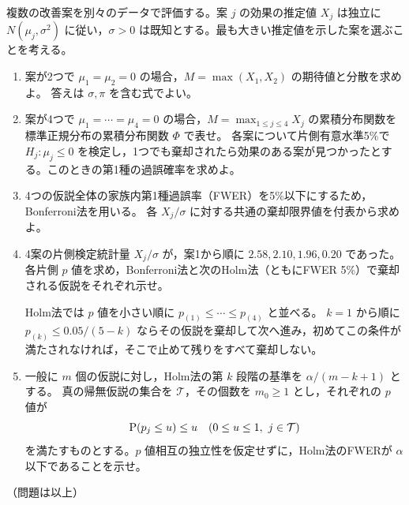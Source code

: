 \documentclass[a4paper,11pt]{ltjsarticle}
\begin{document}
複数の改善案を別々のデータで評価する。案 $j$ の効果の推定値 $X_j$ は独立に
$N(\mu_j,\sigma^2)$ に従い，$\sigma>0$ は既知とする。最も大きい推定値を示した案を選ぶことを考える。
\begin{enumerate}
\item 案が2つで $\mu_1=\mu_2=0$ の場合，$M=\max(X_1,X_2)$ の期待値と分散を求めよ。
答えは $\sigma,\pi$ を含む式でよい。
\item 案が4つで $\mu_1=\cdots=\mu_4=0$ の場合，$M=\max_{1\leq j\leq4}X_j$ の累積分布関数を標準正規分布の累積分布関数 $\Phi$ で表せ。
各案について片側有意水準5\%で $H_j:\mu_j\leq0$ を検定し，1つでも棄却されたら効果のある案が見つかったとする。このときの第1種の過誤確率を求めよ。
\item 4つの仮説全体の家族内第1種過誤率（FWER）を5\%以下にするため，Bonferroni法を用いる。
各 $X_j/\sigma$ に対する共通の棄却限界値を付表から求めよ。
\item 4案の片側検定統計量 $X_j/\sigma$ が，案1から順に $2.58,2.10,1.96,0.20$ であった。
各片側 $p$ 値を求め，Bonferroni法と次のHolm法（ともにFWER 5\%）で棄却される仮説をそれぞれ示せ。

Holm法では $p$ 値を小さい順に $p_{(1)}\leq\cdots\leq p_{(4)}$ と並べる。
$k=1$ から順に $p_{(k)}\leq0.05/(5-k)$ ならその仮説を棄却して次へ進み，初めてこの条件が満たされなければ，そこで止めて残りをすべて棄却しない。
\item 一般に $m$ 個の仮説に対し，Holm法の第 $k$ 段階の基準を $\alpha/(m-k+1)$ とする。
真の帰無仮説の集合を $\mathcal T$，その個数を $m_0\geq1$ とし，それぞれの $p$ 値が
\[
\operatorname{P}(p_j\leq u)\leq u\quad(0\leq u\leq1,\ j\in\mathcal T)
\]
を満たすものとする。$p$ 値相互の独立性を仮定せずに，Holm法のFWERが $\alpha$ 以下であることを示せ。
\end{enumerate}
\vfill
\begin{center}（問題は以上）\end{center}
\end{document}
